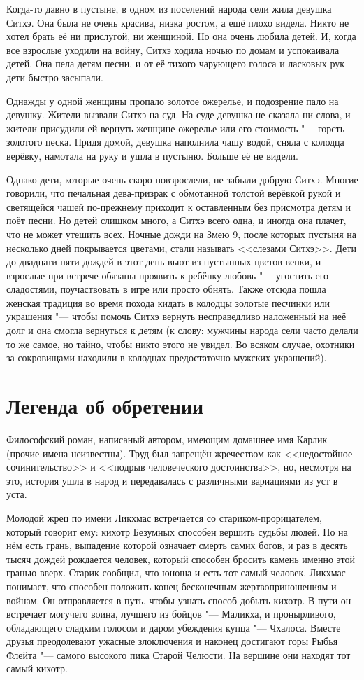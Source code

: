 \documentclass[a4paper,10pt]{book}
\begin{document}
Когда-то давно в пустыне, в одном из поселений народа сели 
жила девушка Ситхэ. Она была не очень красива, низка ростом, а ещё плохо 
видела. Никто не хотел брать её ни прислугой, ни женщиной. Но она очень любила 
детей. И, когда все взрослые уходили на войну, Ситхэ ходила ночью по домам и 
успокаивала детей. Она пела детям песни, и от её тихого чарующего голоса и 
ласковых рук дети быстро засыпали.

Однажды у одной женщины пропало золотое ожерелье, и подозрение 
пало на девушку. Жители вызвали Ситхэ на суд. На суде девушка не сказала ни 
слова, и жители присудили ей вернуть женщине ожерелье или его стоимость "--- 
горсть золотого песка. Придя домой, девушка наполнила чашу водой, сняла с 
колодца верёвку, намотала на руку и ушла в пустыню. 
Больше её не видели.

Однако дети, которые очень скоро повзрослели, не забыли добрую Ситхэ. Многие 
говорили, что печальная дева-призрак с обмотанной толстой верёвкой рукой и 
светящейся чашей по-прежнему приходит к оставленным без присмотра детям и поёт 
песни. Но детей слишком много, а Ситхэ всего одна, и иногда она плачет, что не 
может утешить всех. Ночные дожди на Змею 9, после которых пустыня на несколько 
дней покрывается цветами, стали называть <<слезами Ситхэ>>. Дети до двадцати 
пяти дождей в этот день вьют из пустынных цветов венки, и взрослые при встрече 
обязаны проявить к ребёнку любовь "--- угостить его сладостями, поучаствовать в 
игре или просто обнять. Также отсюда пошла женская традиция во время похода 
кидать в колодцы золотые песчинки или украшения "--- чтобы помочь Ситхэ вернуть 
несправедливо наложенный на неё долг и она смогла вернуться к детям (к слову: 
мужчины народа сели часто делали то же самое, но тайно, чтобы никто этого не 
увидел. Во всяком случае, охотники за сокровищами находили в колодцах 
предостаточно мужских украшений).

\section{Легенда об обретении}

Философский роман, написаный автором, имеющим домашнее имя Карлик 
(прочие имена неизвестны). Труд был запрещён жречеством как <<недостойное 
сочинительство>> и <<подрыв человеческого достоинства>>, но, несмотря на это, 
история ушла в народ и передавалась с различными вариациями из уст в уста.

Молодой жрец по имени Ликхмас встречается со стариком-прорицателем, который 
говорит ему: кихотр Безумных способен вершить судьбы людей. Но на нём есть 
грань, выпадение которой означает смерть самих богов, и раз в десять тысяч 
дождей рождается человек, который способен бросить камень именно этой гранью 
вверх. Старик сообщил, что юноша и есть тот самый человек. Ликхмас понимает, 
что способен положить конец бесконечным жертвоприношениям и войнам. Он 
отправляется в путь, чтобы узнать способ добыть кихотр. В пути он встречает 
могучего воина, лучшего из бойцов "--- Маликха, и пронырливого, обладающего 
сладким голосом и даром убеждения купца "--- Чхалоса. Вместе друзья 
преодолевают 
ужасные злоключения и наконец достигают горы Рыбья Флейта "--- самого высокого 
пика Старой Челюсти. На вершине они находят тот самый кихотр.
\end{document}
